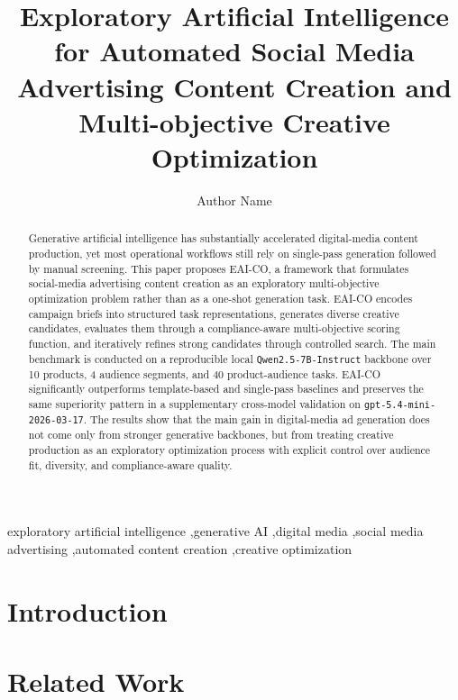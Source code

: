 \documentclass[preprint,12pt]{elsarticle}
\begin{document}
\begin{frontmatter}

\title{Exploratory Artificial Intelligence for Automated Social Media Advertising Content Creation and Multi-objective Creative Optimization}

\author{Author Name}
\address{Affiliation}

\begin{abstract}
Generative artificial intelligence has substantially accelerated digital-media content production, yet most operational workflows still rely on single-pass generation followed by manual screening. This paper proposes EAI-CO, a framework that formulates social-media advertising content creation as an exploratory multi-objective optimization problem rather than as a one-shot generation task. EAI-CO encodes campaign briefs into structured task representations, generates diverse creative candidates, evaluates them through a compliance-aware multi-objective scoring function, and iteratively refines strong candidates through controlled search. The main benchmark is conducted on a reproducible local \texttt{Qwen2.5-7B-Instruct} backbone over 10 products, 4 audience segments, and 40 product-audience tasks. EAI-CO significantly outperforms template-based and single-pass baselines and preserves the same superiority pattern in a supplementary cross-model validation on \texttt{gpt-5.4-mini-2026-03-17}. The results show that the main gain in digital-media ad generation does not come only from stronger generative backbones, but from treating creative production as an exploratory optimization process with explicit control over audience fit, diversity, and compliance-aware quality.
\end{abstract}

\begin{keyword}
exploratory artificial intelligence \sep generative AI \sep digital media \sep social media advertising \sep automated content creation \sep creative optimization
\end{keyword}

\end{frontmatter}

\section{Introduction}

\section{Related Work}
\end{document}
